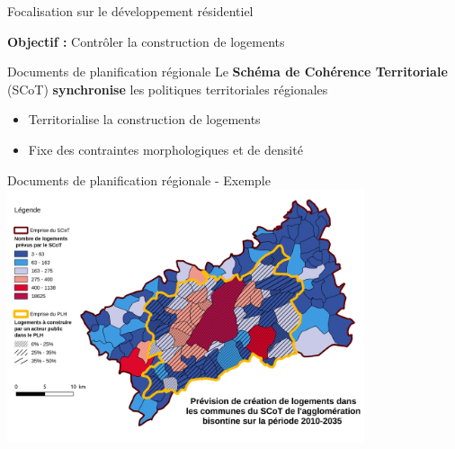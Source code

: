 \documentclass[xcolor=table]{beamer}
\begin{document}
\begin{frame}{Focalisation sur le développement résidentiel}
	\begin{block}{}
		\centering
		\textbf{Objectif :} Contrôler la construction de logements
	\end{block}
	\begin{block}{}

	\end{block}
\end{frame}

\begin{frame}{Documents de planification régionale}
	Le \textbf{Schéma de Cohérence Territoriale} (SCoT) \textbf{synchronise} les politiques territoriales régionales
	\begin{itemize}
		\item Territorialise la construction de logements
		\item Fixe des contraintes morphologiques et de densité
	\end{itemize}
\end{frame}

\begin{frame}{Documents de planification régionale - Exemple}
	\includegraphics[width=10.5cm]{cartes/prevision-plh.png}
\end{frame}
\end{document}
